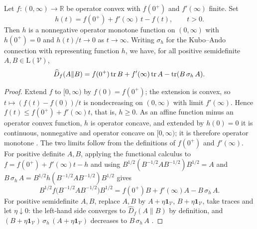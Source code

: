  
\begin{lemma}\label{cont:lem:maxf decomposition}
Let $f:(0,\infty)\to\mathbb{R}$ be operator convex with $f(0^+)$ and $f'(\infty)$ finite. Set
\[
h(t)=f(0^+)+f'(\infty)\,t-f(t),\qquad t>0.
\]
Then $h$ is a nonnegative operator monotone function on $(0,\infty)$ with
$h(0^+)=0$ and $h(t)/t\to0$ as $t\to\infty$. Writing $\sigma_h$ for the Kubo--Ando connection with representing
function $h$, we have, for all positive semidefinite $A,B\in \mathrm{L}(\mathcal{V})$,
\[
\widehat{D}_f(A\|B)=f(0^+)\operatorname{tr} B+f'(\infty)\operatorname{tr} A-\operatorname{tr}(B\,\sigma_h\,A).
\]
\end{lemma}
\begin{proof}
Extend $f$ to $[0,\infty)$ by $f(0)=f(0^+)$; the extension is convex, so $t\mapsto (f(t)-f(0))/t$ is
nondecreasing on $(0,\infty)$ with limit $f'(\infty)$. Hence $f(t)\leq f(0^+)+f'(\infty)t$, that is, $h\geq 0$.
As an affine function minus an operator convex function, $h$ is operator concave, and extended by $h(0)=0$ it is
continuous, nonnegative and operator concave on $[0,\infty)$; it is therefore operator monotone
\cite[Theorem~V.2.5]{bhatia1997matrix}. The two limits follow from the definitions of $f(0^+)$ and $f'(\infty)$.
For positive definite $A,B$, applying the functional calculus to $f=f(0^+)+f'(\infty)t-h$ and using
$B^{1/2}(B^{-1/2}AB^{-1/2})B^{1/2}=A$ and $B\,\sigma_h\,A=B^{1/2}h(B^{-1/2}AB^{-1/2})B^{1/2}$ gives
\[
B^{1/2}f\big(B^{-1/2}AB^{-1/2}\big)B^{1/2}=f(0^+)B+f'(\infty)A-B\,\sigma_h\,A .
\]
For positive semidefinite $A,B$, replace $A,B$ by $A+\eta\mathbf{1}_{\mathcal{V}}$, $B+\eta\mathbf{1}_{\mathcal{V}}$, take traces
and let $\eta\downarrow0$: the left-hand side converges to $\widehat{D}_f(A\|B)$ by definition, and
$(B+\eta\mathbf{1}_{\mathcal{V}})\,\sigma_h\,(A+\eta\mathbf{1}_{\mathcal{V}})$ decreases to $B\,\sigma_h\,A$ \cite{KuboAndo1980}.
\end{proof}
 

